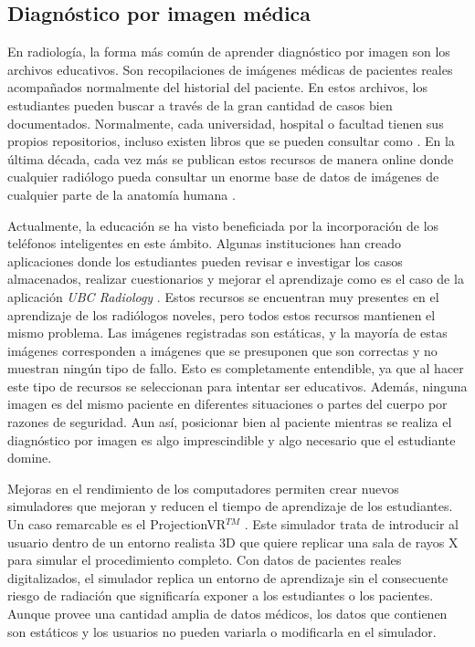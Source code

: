 \subsection{Diagnóstico por imagen médica}
\label{art:xraysim}

En radiología, la forma más común de aprender diagnóstico por imagen son los archivos educativos. Son recopilaciones de imágenes médicas de pacientes reales acompañados normalmente del historial del paciente. En estos archivos, los estudiantes pueden buscar a través de la gran cantidad de casos bien documentados. Normalmente, cada universidad, hospital o facultad tienen sus propios repositorios, incluso existen libros que se pueden consultar como \cite{carver2012medical}.
En la última década, cada vez más se publican estos recursos de manera online donde cualquier radiólogo pueda consultar un enorme base de datos de imágenes de cualquier parte de la anatomía humana \cite{deshpande2017integrated}. 

Actualmente, la educación se ha visto beneficiada por la incorporación de los teléfonos inteligentes en este ámbito. Algunas instituciones han creado aplicaciones donde los estudiantes pueden revisar e investigar los casos almacenados, realizar cuestionarios y mejorar el aprendizaje como es el caso de la aplicación \emph{UBC Radiology} \cite{Spouge2017}. Estos recursos se encuentran muy presentes en el aprendizaje de los radiólogos noveles, pero todos estos recursos mantienen el mismo problema. Las imágenes registradas son estáticas, y la mayoría de estas imágenes corresponden a imágenes que se presuponen que son correctas y no muestran ningún tipo de fallo. Esto es completamente entendible, ya que al hacer este tipo de recursos se seleccionan para intentar ser educativos. Además, ninguna imagen es del mismo paciente en diferentes situaciones o partes del cuerpo por razones de seguridad. Aun así, posicionar bien al paciente mientras se realiza el diagnóstico por imagen es algo imprescindible y algo necesario que el estudiante domine.

Mejoras en el rendimiento de los computadores permiten crear nuevos simuladores que mejoran y reducen el tiempo de aprendizaje de los estudiantes. Un caso remarcable es el  ProjectionVR$^{TM}$ \cite{shanahan2016student}. Este simulador trata de introducir al usuario dentro de un entorno realista 3D que quiere replicar una sala de rayos X para simular el procedimiento completo. Con datos de pacientes reales digitalizados, el simulador replica un entorno de aprendizaje sin el consecuente riesgo de radiación que significaría exponer a los estudiantes o los pacientes. Aunque provee una cantidad amplia de datos médicos, los datos que contienen son estáticos y los usuarios no pueden variarla o modificarla en el simulador. 

